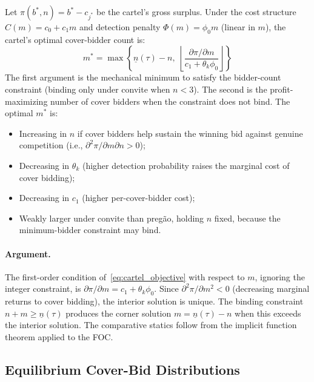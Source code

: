 \begin{proposition}
\label{prop:optimal_m}
Let $\pi(b^*, n) = b^* - c_{j^*}$ be the cartel's gross surplus. Under
the cost structure $C(m) = c_0 + c_1 m$ and detection penalty
$\Phi(m) = \phi_0 m$ (linear in $m$), the cartel's optimal cover-bidder
count is:
\begin{equation}
  m^* = \max\left\{\underline{n}(\tau) - n, \;
  \left\lfloor \frac{\partial \pi / \partial m}{c_1 + \theta_k \phi_0}
  \right\rfloor \right\}
  \label{eq:optimal_m}
\end{equation}
\noindent The first argument is the mechanical minimum to satisfy the
bidder-count constraint (binding only under convite when $n < 3$). The
second is the profit-maximizing number of cover bidders when the
constraint does not bind. The optimal $m^*$ is:
\begin{itemize}
  \item Increasing in $n$ if cover bidders help sustain the winning bid
    against genuine competition (i.e., $\partial^2 \pi / \partial m
    \partial n > 0$);
  \item Decreasing in $\theta_k$ (higher detection probability raises
    the marginal cost of cover bidding);
  \item Decreasing in $c_1$ (higher per-cover-bidder cost);
  \item Weakly larger under convite than preg\~ao, holding $n$ fixed,
    because the minimum-bidder constraint may bind.
\end{itemize}
\end{proposition}

\paragraph{Argument.}
The first-order condition of~\eqref{eq:cartel_objective} with respect
to $m$, ignoring the integer constraint, is $\partial \pi / \partial m
= c_1 + \theta_k \phi_0$. Since $\partial^2 \pi / \partial m^2 < 0$
(decreasing marginal returns to cover bidding), the interior solution is
unique. The binding constraint $n + m \geq \underline{n}(\tau)$
produces the corner solution $m = \underline{n}(\tau) - n$ when this
exceeds the interior solution. The comparative statics follow from the
implicit function theorem applied to the FOC.




\subsection{Equilibrium Cover-Bid Distributions}
\label{sec:cover_distributions}

